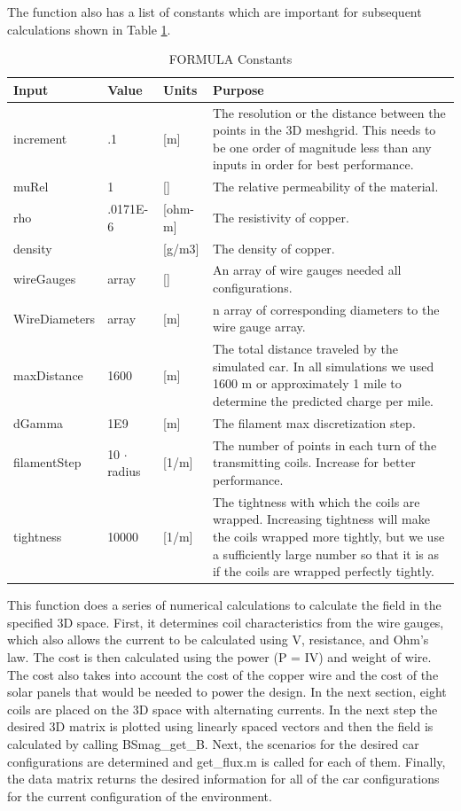 The function also has a list of constants which are important for subsequent calculations shown in Table \ref{t7}.

\begin{table}[H]
    \caption[FORMULA Constants]{FORMULA Constants}
    \begin{center}
    \begin{tabular}{| p{} | p{} | p{} | p{} |}
    \hline
    Input & Value & Units & Purpose \\
    \hline \hline
    increment & .1 & [m] & The resolution or the distance between the points in the 3D meshgrid. This needs to be one order of magnitude less than any inputs in order for best performance. \\
    muRel & 1 & [] & The relative permeability of the material. \\
    rho & .0171E-6 & [ohm-m] & The resistivity of copper. \\
    density & & [g/m3] & The density of copper. \\
    wireGauges & array & [] & An array of wire gauges needed all configurations. \\
    WireDiameters & array & [m] & n array of corresponding diameters to the wire gauge array. \\
    maxDistance & 1600 & [m] & The total distance traveled by the simulated car. In all simulations we used 1600 m or approximately 1 mile to determine the predicted charge per mile. \\
    dGamma & 1E9 & [m] & The filament max discretization step. \\
    filamentStep & 10 $\cdot$ radius & [1/m] & The number of points in each turn of the transmitting coils. Increase for better performance. \\
    tightness & 10000 & [1/m] & The tightness with which the coils are wrapped. Increasing tightness will make the coils wrapped more tightly, but we use a sufficiently large number so that it is as if the coils are wrapped perfectly tightly. \\
    \hline
    \end{tabular}
    \end{center}
    \label{t7}
\end{table}

This function does a series of numerical calculations to calculate the field in the specified 3D space. 
First, it determines coil characteristics from the wire gauges, which also allows the current to be 
calculated using V, resistance, and Ohm’s law. The cost is then calculated using the power (P = IV) 
and weight of wire. The cost also takes into account the cost of the copper wire and the cost of the 
solar panels that would be needed to power the design. In the next section, eight coils are placed on the 
3D space with alternating currents. In the next step the desired 3D matrix is plotted using linearly spaced 
vectors and then the field is calculated by calling BSmag\_get\_B. Next, the scenarios for the desired car 
configurations are determined and get\_flux.m is called for each of them. Finally, the data matrix returns 
the desired information for all of the car configurations for the current configuration of the environment.

